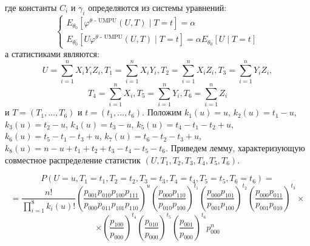     где константы $C_i$ и $\gamma_i$ определяются из системы уравнений:
    $$
    \begin{cases}
        E_{\theta_0}[\varphi^{\text{$\theta$ - UMPU}}(U,T) \mid T=t]=\alpha \\
        E_{\theta_0}[U\varphi^{\text{$\theta$ - UMPU}}(U,T) \mid T=t]=\alpha E_{\theta_0}[U \mid T=t]
    \end{cases}
    $$
    а статистиками являются:
    $$
        U = \sum_{i=1}^n X_i Y_i Z_i,
        T_1 = \sum_{i=1}^n X_i Y_i,
        T_2 = \sum_{i=1}^n X_i Z_i,
        T_3 = \sum_{i=1}^n Y_i Z_i,
    $$
    $$
        T_4 = \sum_{i=1}^n X_i,
        T_5 = \sum_{i=1}^n Y_i,
        T_6 = \sum_{i=1}^n Z_i
    $$
    и $T=(T_1,\ldots,T_6)$ и $t=(t_1,\ldots,t_6)$.
    Положим $k_1(u)=u$, $k_2(u)=t_1-u$, $k_3(u)=t_2-u$, $k_4(u)=t_3-u$, $k_5(u)=t_4-t_1-t_2+u$, $k_6(u)=t_5-t_1-t_3+u$,
    $k_7(u)=t_6 - t_2 - t_3 + u$, $k_8(u)=n-u+t_1+t_2+t_3-t_4-t_5-t_6$. Приведем лемму, характеризующую совместное распределение статистик 
    $(U,T_1,T_2,T_3,T_4,T_5,T_6)$.
    \begin{lemma}\label{joint_distribution}
        $$P(U=u, T_1=t_1, T_2=t_2, T_3=t_3, T_4=t_4, T_5=t_5, T_6=t_6)=$$
        $$=\frac{n!}{\prod_{i=1}^8 k_i(u)!} \left(\dfrac{p_{001}p_{010}p_{100}p_{111}}{p_{000}p_{011}p_{101}p_{110}}\right)^u
            \left(\dfrac{p_{000} p_{110}}{p_{010} p_{100}}\right)^{t_1}\left(\dfrac{p_{000}p_{101}}{p_{001}p_{100}}\right)^{t_2}
            \left(\dfrac{p_{000}p_{011}}{p_{001}p_{010}}\right)^{t_3} \times$$
        $$
            \times \left(\dfrac{p_{100}}{p_{000}}\right)^{t_4}
            \left(\dfrac{p_{010}}{p_{000}}\right)^{t_5} \left(\dfrac{p_{001}}{p_{000}}\right)^{t_6} p_{000}^n
        $$
    \end{lemma}
